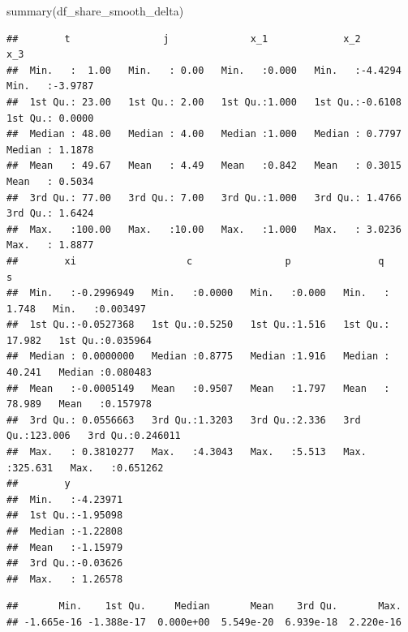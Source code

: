 \documentclass[
]{book}
\newenvironment{Shaded}{\begin{snugshade}}{\end{snugshade}}
\newcommand{\FunctionTok}[1]{\textcolor[rgb]{0.00,0.00,0.00}{#1}}
\newcommand{\NormalTok}[1]{#1}
\newcommand{\SpecialCharTok}[1]{\textcolor[rgb]{0.00,0.00,0.00}{#1}}
\begin{document}
\begin{Shaded}
\begin{Highlighting}[]
\FunctionTok{summary}\NormalTok{(df\_share\_smooth\_delta)}
\end{Highlighting}
\end{Shaded}

\begin{verbatim}
##        t                j              x_1             x_2               x_3         
##  Min.   :  1.00   Min.   : 0.00   Min.   :0.000   Min.   :-4.4294   Min.   :-3.9787  
##  1st Qu.: 23.00   1st Qu.: 2.00   1st Qu.:1.000   1st Qu.:-0.6108   1st Qu.: 0.0000  
##  Median : 48.00   Median : 4.00   Median :1.000   Median : 0.7797   Median : 1.1878  
##  Mean   : 49.67   Mean   : 4.49   Mean   :0.842   Mean   : 0.3015   Mean   : 0.5034  
##  3rd Qu.: 77.00   3rd Qu.: 7.00   3rd Qu.:1.000   3rd Qu.: 1.4766   3rd Qu.: 1.6424  
##  Max.   :100.00   Max.   :10.00   Max.   :1.000   Max.   : 3.0236   Max.   : 1.8877  
##        xi                   c                p               q                 s           
##  Min.   :-0.2996949   Min.   :0.0000   Min.   :0.000   Min.   :  1.748   Min.   :0.003497  
##  1st Qu.:-0.0527368   1st Qu.:0.5250   1st Qu.:1.516   1st Qu.: 17.982   1st Qu.:0.035964  
##  Median : 0.0000000   Median :0.8775   Median :1.916   Median : 40.241   Median :0.080483  
##  Mean   :-0.0005149   Mean   :0.9507   Mean   :1.797   Mean   : 78.989   Mean   :0.157978  
##  3rd Qu.: 0.0556663   3rd Qu.:1.3203   3rd Qu.:2.336   3rd Qu.:123.006   3rd Qu.:0.246011  
##  Max.   : 0.3810277   Max.   :4.3043   Max.   :5.513   Max.   :325.631   Max.   :0.651262  
##        y           
##  Min.   :-4.23971  
##  1st Qu.:-1.95098  
##  Median :-1.22808  
##  Mean   :-1.15979  
##  3rd Qu.:-0.03626  
##  Max.   : 1.26578
\end{verbatim}

\begin{Shaded}
\end{Shaded}

\begin{verbatim}
##       Min.    1st Qu.     Median       Mean    3rd Qu.       Max. 
## -1.665e-16 -1.388e-17  0.000e+00  5.549e-20  6.939e-18  2.220e-16
\end{verbatim}
\end{document}

